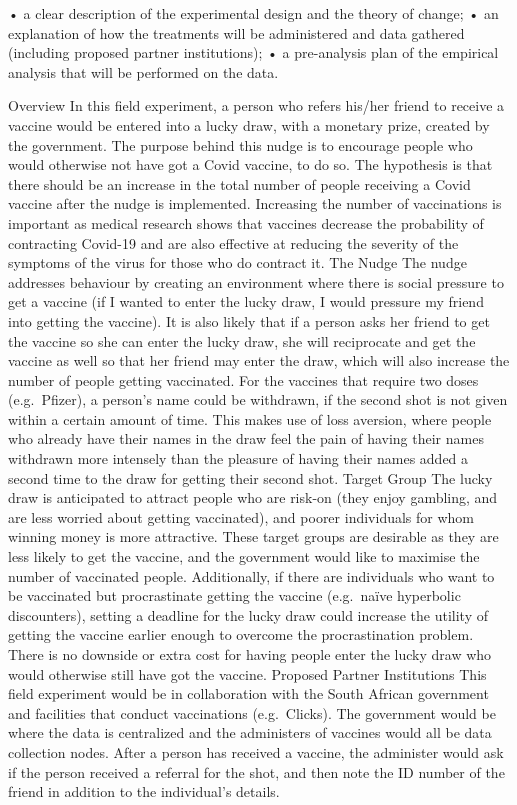 \documentclass[11pt,preprint, authoryear]{elsarticle}
\numberwithin{equation}{section}
\numberwithin{figure}{section}
\numberwithin{table}{section}
\begin{document}
• a clear description of the experimental design and the theory of
change; • an explanation of how the treatments will be administered and
data gathered (including proposed partner institutions); • a
pre-analysis plan of the empirical analysis that will be performed on
the data.

Overview In this field experiment, a person who refers his/her friend to
receive a vaccine would be entered into a lucky draw, with a monetary
prize, created by the government. The purpose behind this nudge is to
encourage people who would otherwise not have got a Covid vaccine, to do
so. The hypothesis is that there should be an increase in the total
number of people receiving a Covid vaccine after the nudge is
implemented. Increasing the number of vaccinations is important as
medical research shows that vaccines decrease the probability of
contracting Covid-19 and are also effective at reducing the severity of
the symptoms of the virus for those who do contract it. The Nudge The
nudge addresses behaviour by creating an environment where there is
social pressure to get a vaccine (if I wanted to enter the lucky draw, I
would pressure my friend into getting the vaccine). It is also likely
that if a person asks her friend to get the vaccine so she can enter the
lucky draw, she will reciprocate and get the vaccine as well so that her
friend may enter the draw, which will also increase the number of people
getting vaccinated. For the vaccines that require two doses
(e.g.~Pfizer), a person's name could be withdrawn, if the second shot is
not given within a certain amount of time. This makes use of loss
aversion, where people who already have their names in the draw feel the
pain of having their names withdrawn more intensely than the pleasure of
having their names added a second time to the draw for getting their
second shot. Target Group The lucky draw is anticipated to attract
people who are risk-on (they enjoy gambling, and are less worried about
getting vaccinated), and poorer individuals for whom winning money is
more attractive. These target groups are desirable as they are less
likely to get the vaccine, and the government would like to maximise the
number of vaccinated people. Additionally, if there are individuals who
want to be vaccinated but procrastinate getting the vaccine (e.g.~naïve
hyperbolic discounters), setting a deadline for the lucky draw could
increase the utility of getting the vaccine earlier enough to overcome
the procrastination problem. There is no downside or extra cost for
having people enter the lucky draw who would otherwise still have got
the vaccine. Proposed Partner Institutions This field experiment would
be in collaboration with the South African government and facilities
that conduct vaccinations (e.g.~Clicks). The government would be where
the data is centralized and the administers of vaccines would all be
data collection nodes. After a person has received a vaccine, the
administer would ask if the person received a referral for the shot, and
then note the ID number of the friend in addition to the individual's
details.
\end{document}
